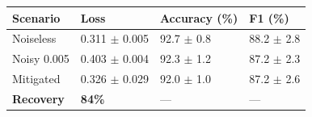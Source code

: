 \begin{tabular}{llll}
\toprule
Scenario & Loss & Accuracy (\%) & F1 (\%) \\
\midrule
Noiseless & 0.311 $\pm$ 0.005 & 92.7 $\pm$ 0.8 & 88.2 $\pm$ 2.8 \\
Noisy 0.005 & 0.403 $\pm$ 0.004 & 92.3 $\pm$ 1.2 & 87.2 $\pm$ 2.3 \\
Mitigated & 0.326 $\pm$ 0.029 & 92.0 $\pm$ 1.0 & 87.2 $\pm$ 2.6 \\
\textbf{Recovery} & \textbf{84\%} & --- & --- \\
\bottomrule
\end{tabular}

